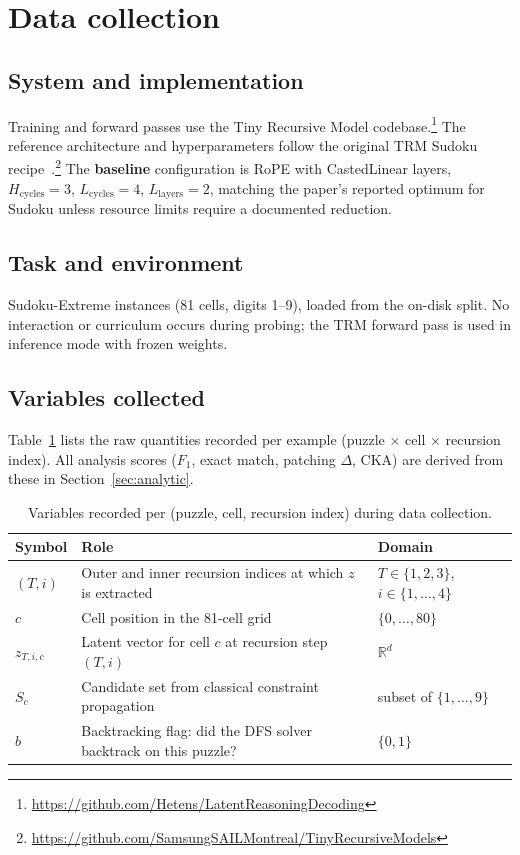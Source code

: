 \documentclass{article}
\begin{document}
\section{Data collection}

\subsection{System and implementation}

Training and forward passes use the Tiny Recursive Model codebase.\footnote{\url{https://github.com/Hetens/LatentReasoningDecoding}}  The reference architecture and hyperparameters follow the original TRM Sudoku recipe~\cite{jolicoeur2025}.\footnote{\url{https://github.com/SamsungSAILMontreal/TinyRecursiveModels}}  The \textbf{baseline} configuration is RoPE with CastedLinear layers, $H_\text{cycles} = 3$, $L_\text{cycles} = 4$, $L_\text{layers} = 2$, matching the paper's reported optimum for Sudoku unless resource limits require a documented reduction.

\subsection{Task and environment}

Sudoku-Extreme instances (81 cells, digits 1--9), loaded from the on-disk split.  No interaction or curriculum occurs during probing; the TRM forward pass is used in inference mode with frozen weights.

\subsection{Variables collected}

Table~\ref{tab:measured} lists the raw quantities recorded per example (puzzle $\times$ cell $\times$ recursion index).  All analysis scores ($F_1$, exact match, patching $\Delta$, CKA) are derived from these in Section~\ref{sec:analytic}.

\begin{table}[H]
\centering
\caption{Variables recorded per (puzzle, cell, recursion index) during data collection.}
\label{tab:measured}
\small
\begin{tabular}{@{}llp{3cm}@{}}
\toprule
\textbf{Symbol} & \textbf{Role} & \textbf{Domain} \\
\midrule
$(T,i)$ & Outer and inner recursion indices at which $z$ is extracted & $T \!\in\! \{1,2,3\}$, $i \!\in\! \{1,\ldots,4\}$ \\
$c$ & Cell position in the 81-cell grid & $\{0,\ldots,80\}$ \\
$z_{T,i,c}$ & Latent vector for cell $c$ at recursion step $(T,i)$ & $\mathbb{R}^{d}$ \\
$S_{c}$ & Candidate set from classical constraint propagation & subset of $\{1,\ldots,9\}$ \\
$b$ & Backtracking flag: did the DFS solver backtrack on this puzzle? & $\{0,1\}$ \\
\bottomrule
\end{tabular}
\end{table}
\end{document}
